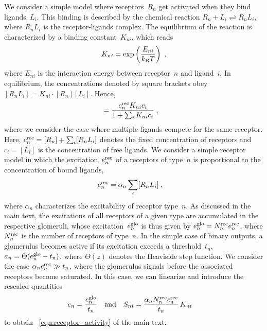 \documentclass[twocolumn, superscriptaddress]{revtex4}
\renewcommand{\eqref}[1]{\ref{#1}}
\begin{document}
We consider a simple model where receptors~$R_n$ get activated when they bind ligands~$L_i$.
This binding is described by the chemical reaction \mbox{$R_n + L_i \rightleftharpoons R_nL_i$}, where $R_nL_i$ is the receptor-ligands complex.
The equilibrium of the reaction is characterized by a binding constant~$K_{ni}$, which reads
\begin{equation}
	K_{ni} = \exp\left(\frac{E_{ni}}{k_{\rm B} T}\right)	
	\label{eqn:binding_constant}
	\;,
\end{equation}
where $E_{ni}$ is the interaction energy between receptor~$n$ and ligand~$i$. 
In equilibrium, the concentrations denoted by square brackets obey $[R_nL_i] = K_{ni} \cdot [R_n][L_i]$.
Hence,
\begin{align}
	[R_nL_i] &= \frac{c^{\rm rec}_n K_{ni} c_i}{1 + \sum_i K_{ni} c_i}
	\label{eqn:binding}
	\;,
\end{align}
where we consider the case where multiple ligands compete for the same receptor.
Here, $c^{\rm rec}_n=[R_n] + \sum_i [R_nL_i]$ denotes the fixed concentration of receptors and $c_i = [L_i]$ is the concentration of free ligands.
We consider a simple receptor model in which the excitation~$e^{\rm rec}_n$ of a receptors of type~$n$ is proportional to the concentration of bound ligands,
\begin{align}
	e^{\rm rec}_n &= \alpha_n \sum_i  [R_nL_i]
	\label{eqn:receptor_occupancy}
	\;,
\end{align}
where $\alpha_n$ characterizes the excitability of receptor type~$n$.
As discussed in the main text, the excitations of all receptors of a given type are accumulated in the respective glomeruli, whose excitation~$e^{\rm glo}_n$ is thus given by $e^{\rm glo}_n = N^{\rm rec}_n e^{\rm rec}_n$, where $N^{\rm rec}_n$ is the number of receptors of type~$n$.
In the simple case of binary outputs, a glomerulus becomes active if its excitation exceeds a threshold~$t_n$, $a_n = \Theta(e^{\rm glo}_n - t_n)$, where $\Theta(z)$ denotes the Heaviside step function.
We consider the case $\alpha_n c^{\rm rec}_n \gg t_n$, where the glomerulus signals before the associated receptors become saturated.
In this case, we can linearize  and introduce the rescaled quantities
\begin{align}
	e_n &= \frac{e^{\rm glo}_n}{t_n}
& \text{and} &&
	S_{ni} &= \frac{\alpha_n N^{\rm rec}_n c^{\rm rec}_n}{t_n} \, K_{ni}
	\label{eqn:sensitivities}
\end{align}
to obtain --\eqref{eqn:receptor_activity} of the main text.
\end{document}
